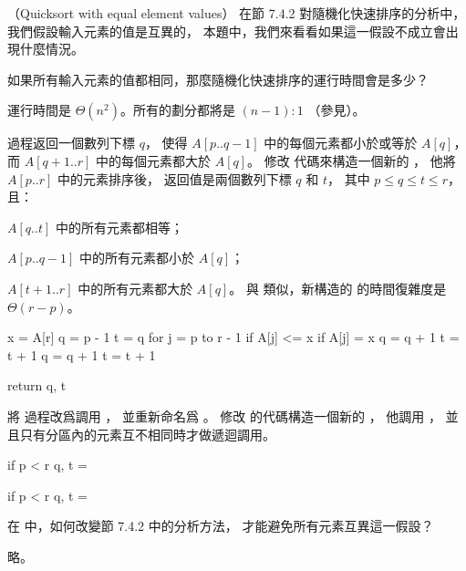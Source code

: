 （Quicksort with equal element values）
在節 7.4.2 對隨機化快速排序的分析中，
我們假設輸入元素的值是互異的，
本題中，我們來看看如果這一假設不成立會出現什麼情況。
\startigBase[a]
\item 如果所有輸入元素的值都相同，那麼隨機化快速排序的運行時間會是多少？
\stopigBase

\startANSWER
運行時間是 $\Theta(n^2)$。所有的劃分都將是 $(n-1):1$
 （參見）。
\stopANSWER

\startigBase[a,continue]
\item {} 過程返回一個數列下標 $q$，
使得 $A[p..q-1]$ 中的每個元素都小於或等於 $A[q]$，
而 $A[q+1..r]$ 中的每個元素都大於 $A[q]$。
修改  代碼來構造一個新的 ，
他將 $A[p..r]$ 中的元素排序後，
返回值是兩個數列下標 $q$ 和 $t$，
其中 $p\le q\le t\le r$，且：
\startigBase
\item $A[q..t]$ 中的所有元素都相等；
\item $A[p..q-1]$ 中的所有元素都小於 $A[q]$；
\item $A[t+1..r]$ 中的所有元素都大於 $A[q]$。
\stopigBase
與  類似，新構造的  的時間復雜度是 $\Theta(r-p)$。
\stopigBase

\startANSWER
{}
\startCLRSCODE
x = A[r]
q = p - 1
t = q
for j = p to r - 1
	if A[j] <= x
		if A[j] = x
			q = q + 1
		t = t + 1
q = q + 1
t = t + 1

return q, t
\stopCLRSCODE
\stopANSWER

\startigBase[a,continue]
\item 將  過程改爲調用 ，
並重新命名爲 。
修改  的代碼構造一個新的 ，
他調用 ，
並且只有分區內的元素互不相同時才做遞迴調用。
\stopigBase

\startANSWER
{}
\startCLRSCODE
if p < r
	q, t = 
\stopCLRSCODE

\startCLRSCODE
if p < r
	q, t = 
\stopCLRSCODE
\stopANSWER

\startigBase[a,continue]
\item 在  中，如何改變節 7.4.2 中的分析方法，
才能避免所有元素互異這一假設？
\stopigBase

\startANSWER
略。
\stopANSWER
\stopPROBLEM

